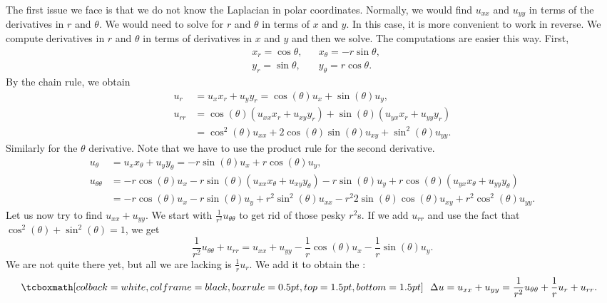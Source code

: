 The first issue we face is that we do not know the Laplacian
in polar coordinates.
Normally, we would find $u_{xx}$ and $u_{yy}$ in terms of
the derivatives in $r$ and $\theta$.  We would need to solve
for $r$ and $\theta$ in terms of $x$ and $y$.  In this case,
it is more convenient to work in
reverse.  We compute derivatives in $r$ and $\theta$ in terms
of derivatives in $x$ and $y$ and then we solve.  The
computations are easier this way.  First,
\begin{equation*}
\begin{aligned}
& x_r = \cos \theta, & &
x_\theta = - r \sin \theta, \\
& y_r = \sin \theta, & &
y_\theta = r \cos \theta.
\end{aligned}
\end{equation*}
By the chain rule, we obtain
\begin{align*}
u_r & = u_x x_r + u_y y_r = \cos(\theta) u_x + \sin(\theta) u_y ,
\\
u_{rr} & =
\cos(\theta) ( u_{xx} x_r +u_{xy} y_r )
+ \sin(\theta) ( u_{yx} x_r +u_{yy} y_r )
\\
&
=
\cos^2(\theta) u_{xx} +
2 \cos(\theta)\sin(\theta) u_{xy} +
\sin^2(\theta) u_{yy} .
\end{align*}
Similarly for the $\theta$ derivative.  Note that we have to use
the product rule for the second derivative.
\begin{align*}
u_\theta & = u_x x_\theta + u_y y_\theta =
-r\sin(\theta) u_x + r\cos(\theta) u_y ,
\\
u_{\theta\theta} & =
-r\cos(\theta) u_x
-r\sin(\theta) (u_{xx} x_\theta + u_{xy} y_\theta)
-r\sin(\theta) u_y
+
r\cos(\theta) (u_{yx} x_\theta + u_{yy} y_\theta)
\\
& = 
-r\cos(\theta) u_x
-r\sin(\theta) u_y
+r^2 \sin^2(\theta) u_{xx}
-r^2 2\sin(\theta)\cos(\theta) u_{xy}
+r^2 \cos^2(\theta) u_{yy} .
\end{align*}
Let us now try to find $u_{xx} + u_{yy}$.  We start with
$\frac{1}{r^2} u_{\theta\theta}$ to get rid of those pesky $r^2$s.
If we add $u_{rr}$
and use the fact that $\cos^2(\theta) +\sin^2(\theta) = 1$, we get
\begin{equation*}
\frac{1}{r^2} u_{\theta\theta}
+
u_{rr}
=
u_{xx} + u_{yy} - \frac{1}{r} \cos(\theta) u_x - \frac{1}{r} \sin(\theta)
u_y .
\end{equation*}
We are not quite there yet, but all we are lacking is 
$\frac{1}{r} u_r$.  We add it to obtain the
\emph{}:
\begin{equation*}
\mybxbg{~~
\Delta u 
=
u_{xx} + u_{yy} =
\frac{1}{r^2} u_{\theta\theta}
+
\frac{1}{r} u_{r}
+
u_{rr} .
~~}
\end{equation*}

